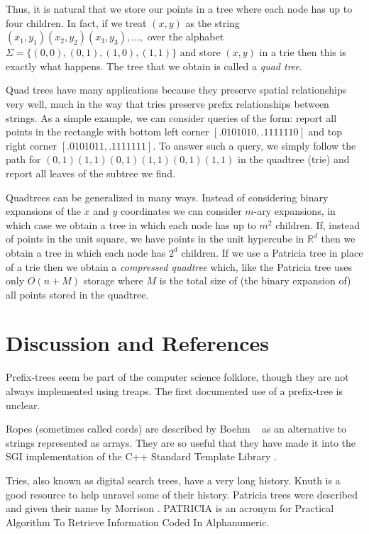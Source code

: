 Thus, it is natural that we store our points in a tree where each node
has up to four children.  In fact, if we treat $(x,y)$ as the string
$(x_1,y_1)(x_2,y_2)(x_3,y_3),\ldots,$ over the alphabet
$\Sigma=\{(0,0),(0,1),(1,0),(1,1)\}$ and store $(x,y)$ in a trie then
this is exactly what happens.  The tree that we obtain is called a
\emph{quad tree}.

Quad trees have many applications because they preserve spatial
relationships very well, much in the way that tries preserve prefix
relationships between strings.  As a simple example, we can consider
queries of the form: report all points in the rectangle with bottom
left corner $[.0101010,.1111110]$ and top right corner
$[.0101011,.1111111]$.  To answer such a query, we simply follow the
path for $(0,1)(1,1)(0,1)(1,1)(0,1)(1,1)$ in the quadtree (trie) and
report all leaves of the subtree we find.

Quadtrees can be generalized in many ways.  Instead of considering
binary expansions of the $x$ and $y$ coordinates we can consider
$m$-ary expansions, in which case we obtain a tree in which each node
has up to $m^2$ children.  If, instead of points in the unit square,
we have points in the unit hypercube in $\mathbb{R}^d$ then we obtain
a tree in which each node has $2^d$ children.  If we use a Patricia
tree in place of a trie then we obtain a \emph{compressed quadtree}
which, like the Patricia tree uses only $O(n+M)$ storage where $M$ is
the total size of (the binary expansion of) all points stored in the
quadtree.  

\section{Discussion and References}

Prefix-trees seem be part of the computer science folklore, though
they are not always implemented using treaps. The first documented use
of a prefix-tree is unclear.

Ropes (sometimes called cords) are described by Boehm \etal\ \cite{bap95}
as an alternative to strings represented as arrays.  They are so useful
that they have made it into the SGI implementation of the C++ Standard
Template Library \cite{x}.

Tries, also known as digital search trees, have a very long history.
Knuth \cite{k73c} is a good resource to help unravel some of their
history.  Patricia trees were described and given their name by
Morrison \cite{m68}.  PATRICIA is an acronym for Practical Algorithm
To Retrieve Information Coded In Alphanumeric.

